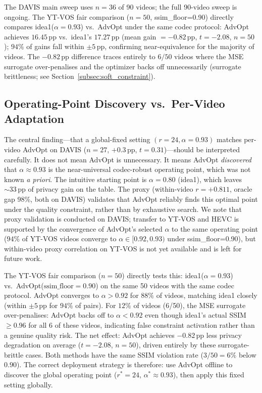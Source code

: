 The DAVIS main sweep uses $n=36$ of 90 videos; the full 90-video sweep is ongoing.
The YT-VOS fair comparison ($n=50$, ssim\_floor=0.90) directly compares idea1($\alpha{=}0.93$) vs.\ AdvOpt under the same codec protocol:
AdvOpt achieves $16.45\,\mathrm{pp}$ vs.\ idea1's $17.27\,\mathrm{pp}$ (mean gain $= -0.82\,\mathrm{pp}$, $t{=}{-}2.08$, $n{=}50$);
$94\%$ of gains fall within $\pm 5\,\mathrm{pp}$, confirming near-equivalence for the majority of videos.
The $-0.82\,\mathrm{pp}$ difference traces entirely to $6/50$ videos where the MSE surrogate over-penalises and the optimizer backs off unnecessarily (surrogate brittleness; see Section~\ref{subsec:soft_constraint}).

\subsection{Operating-Point Discovery vs.\ Per-Video Adaptation}

The central finding---that a global-fixed setting $(r=24,\alpha=0.93)$ matches per-video AdvOpt on DAVIS ($n=27$, $+0.3\,\mathrm{pp}$, $t=0.31$)---should be interpreted carefully.
It does not mean AdvOpt is unnecessary. It means AdvOpt \emph{discovered} that $\alpha\approx 0.93$ is the near-universal codec-robust operating point, which was not known \emph{a priori}.
The intuitive starting point is $\alpha=0.80$ (idea1), which leaves $\sim 33\,\mathrm{pp}$ of privacy gain on the table.
The proxy (within-video $r=+0.811$, oracle gap 98\%, both on DAVIS) validates that AdvOpt reliably finds this optimal point under the quality constraint, rather than by exhaustive search.
We note that proxy validation is conducted on DAVIS; transfer to YT-VOS and HEVC is supported by the convergence of AdvOpt's selected $\alpha$ to the same operating point ($94\%$ of YT-VOS videos converge to $\alpha\in[0.92,0.93)$ under ssim\_floor=0.90), but within-video proxy correlation on YT-VOS is not yet available and is left for future work.

The YT-VOS fair comparison ($n=50$) directly tests this: idea1($\alpha{=}0.93$) vs.\ AdvOpt($\mathrm{ssim\_floor}{=}0.90$) on the same 50 videos with the same codec protocol.
AdvOpt converges to $\alpha{>}0.92$ for $88\%$ of videos, matching idea1 closely (within $\pm 5\,\mathrm{pp}$ for $94\%$ of pairs).
For $12\%$ of videos (6/50), the MSE surrogate over-penalises: AdvOpt backs off to $\alpha{<}0.92$ even though idea1's actual SSIM $\geq 0.96$ for all 6 of these videos, indicating false constraint activation rather than a genuine quality risk.
The net effect: AdvOpt achieves $-0.82\,\mathrm{pp}$ less privacy degradation on average ($t{=}{-}2.08$, $n{=}50$), driven entirely by these surrogate-brittle cases.
Both methods have the same SSIM violation rate ($3/50 = 6\%$ below $0.90$).
The correct deployment strategy is therefore: use AdvOpt offline to discover the global operating point ($r^*{=}24$, $\alpha^*{\approx}0.93$), then apply this fixed setting globally.


